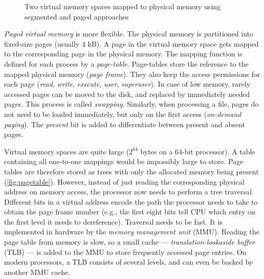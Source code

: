 \begin{figure}
  \caption{Two virtual memory spaces mapped to physical memory using segmented
  and paged approaches}
\end{figure}

\emph{Paged virtual memory} is more flexible. The physical memory is partitioned
into fixed-size pages (usually 4 kB). A page in the virtual memory space gets
mapped to the corresponding page in the physical memory. The mapping function is
defined for each process by a \emph{page-table}. Page-tables store the reference
to the mapped physical memory (\emph{page frame}). They also keep the access
permissions for each page (\emph{read}, \emph{write}, \emph{execute},
\emph{user}, \emph{superuser}). In case of low memory, rarely accessed pages can
be moved to the disk, and replaced by immediately needed pages. This process is
called \emph{swapping}. Similarly, when processing a file, pages do not need to
be loaded immediately, but only on the first access (\emph{on-demand paging}).
The \emph{present} bit is added to differentiate between present and absent
pages.

Virtual memory spaces are quite large ($2^{64}$ bytes on a 64-bit processor). A
table containing all one-to-one mappings would be impossibly large to store.
Page tables are therefore stored as trees with only the allocated memory being
present (\cref{fig:pagetable}). However, instead of just reading the
corresponding physical address on memory access, the processor now needs to
perform a tree traversal. Different bits in a virtual address encode the path
the processor needs to take to obtain the page frame number (e.g., the first
eight bits tell CPU which entry on the first level it needs to dereference).
Traversal needs to be fast. It is implemented in hardware by the \emph{memory
management unit} (MMU). Reading the page table from memory is slow, so a small
cache --- \emph{translation-lookaside buffer} (TLB) --- is added to the MMU to
store frequently accessed page entries. On modern processors, a TLB consists of
several levels, and can even be backed by another MMU cache. 

